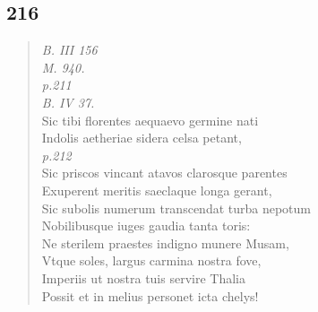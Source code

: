 \documentclass[11pt, a4paper]{report}
\begin{document}
            \subsection*{216}
      \begin{verse}
      \textit{B. III 156} \\ \textit{M. 940.} \\ \textit{p.211} \\ \textit{B. IV 37.} \\ Sic tibi florentes aequaevo germine nati \\ Indolis aetheriae sidera celsa petant, \\ \textit{p.212} \\ Sic priscos vincant atavos clarosque parentes \\ Exuperent meritis saeclaque longa gerant, \\ Sic subolis numerum transcendat turba nepotum \\ Nobilibusque iuges gaudia tanta toris: \\ Ne sterilem praestes indigno munere Musam, \\ Vtque soles, largus carmina nostra fove, \\ Imperiis ut nostra tuis servire Thalia \\ Possit et in melius personet icta chelys! \\ 
      \end{verse}
  
\end{document}
